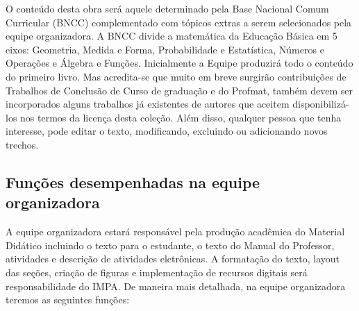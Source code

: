 \documentclass[10 pt]{article}
\begin{document}
O conteúdo desta obra será aquele determinado pela Base Nacional Comum Curricular (BNCC) complementado com tópicos extras a serem selecionados pela equipe organizadora.
A BNCC divide a matemática da Educação Básica em 5 eixos: Geometria, Medida e Forma, Probabilidade e Estatística, Números e Operações e Álgebra e Funções.
Inicialmente a Equipe produzirá todo o conteúdo do primeiro livro.
Mas acredita-se que muito em breve surgirão contribuições de Trabalhos de Conclusão de Curso de graduação e do Profmat, também devem ser incorporados alguns trabalhos já existentes de autores que aceitem disponibilizá-los nos termos da licença desta coleção.
Além disso, qualquer pessoa que tenha interesse, pode editar o texto, modificando, excluindo ou adicionando novos trechos.

\subsection{Funções desempenhadas na equipe organizadora}

A equipe organizadora estará responsável pela produção acadêmica do Material Didático incluindo o texto para o estudante, o texto do Manual do Professor, atividades e descrição de atividades eletrônicas. A formatação do texto, layout das seções, criação de figuras e implementação de recursos digitais será responsabilidade do IMPA. De maneira mais detalhada, na equipe organizadora teremos as seguintes funções:
\vspace{0.2cm}
\end{document}
